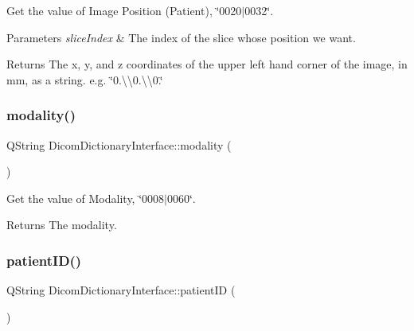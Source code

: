 Get the value of Image Position (Patient), \char`\"{}0020$\vert$0032\char`\"{}. 


\begin{DoxyParams}{Parameters}
{\em slice\+Index} & The index of the slice whose position we want. \\
\hline
\end{DoxyParams}
\begin{DoxyReturn}{Returns}
The x, y, and z coordinates of the upper left hand corner of the image, in mm, as a string. e.\+g. \char`\"{}0.\textbackslash{}\textbackslash{}0.\textbackslash{}\textbackslash{}0.\char`\"{} 
\end{DoxyReturn}
\mbox{\label{class_dicom_dictionary_interface_aff41efeaedec8cf63e1ea211b4a7cbcd}} 
\subsubsection{\texorpdfstring{modality()}{modality()}}
{\footnotesize\ttfamily Q\+String Dicom\+Dictionary\+Interface\+::modality (\begin{DoxyParamCaption}{ }\end{DoxyParamCaption})}



Get the value of Modality, \char`\"{}0008$\vert$0060\char`\"{}. 

\begin{DoxyReturn}{Returns}
The modality. 
\end{DoxyReturn}
\mbox{\label{class_dicom_dictionary_interface_a48dbeb476ece87a7d039bb593f907cd6}} 
\subsubsection{\texorpdfstring{patient\+I\+D()}{patientID()}}
{\footnotesize\ttfamily Q\+String Dicom\+Dictionary\+Interface\+::patient\+ID (\begin{DoxyParamCaption}{ }\end{DoxyParamCaption})}



